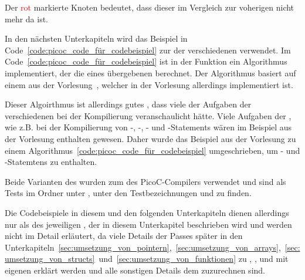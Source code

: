 \begin{Special_Paragraph}
  Der \textcolor{red}{rot} markierte Knoten bedeutet, dass dieser im Vergleich zur voherigen  nicht mehr da ist.
\end{Special_Paragraph}


In den nächsten Unterkapiteln wird das Beispiel in Code~\ref{code:picoc_code_für_codebeispiel} zur  der verschiedenen  verwendet. Im Code~\ref{code:picoc_code_für_codebeispiel} ist in der Funktion  ein  Algorithmus implementiert, der die  eines übergebenen  berechnet. Der Algorithmus basiert auf einem  aus der Vorlesung~\cite{scholl_betriebssysteme_2020}, welcher in der Vorlesung allerdings  implementiert ist.

Dieser  Algoirthmus ist allerdings  gutes , dass viele der Aufgaben der verschiedenen  bei der Kompilierung veranschaulicht hätte. Viele Aufgaben der , wie z.B. bei der Kompilierung von -, -, - und -Statements wären im Beispiel aus der Vorlesung  enthalten gewesen. Daher wurde das Beispiel aus der Vorlesung zu einem  Algorithmus~\ref{code:picoc_code_für_codebeispiel} umgeschrieben, um - und -Statemtens zu enthalten.

Beide Varianten des  wurden zum  des PicoC-Compilers verwendet und sind als Tests im Ordner  unter , unter den Testbezeichnungen  und  zu finden.

Die Codebeispiele in diesem und den folgenden Unterkapiteln dienen allerdings nur als  des jeweiligen , der in diesem Unterkapitel beschrieben wird und werden nicht im Detail erläutert, da viele Details der Passes später in den Unterkapiteln~\ref{sec:umsetzung_von_pointern},~\ref{sec:umsetzung_von_arrays},~\ref{sec:umsetzung_von_structs}~und~\ref{sec:umsetzung_von_funktionen} zu ,  ,  und  mit eigenen  erklärt werden und alle sonstigen Details dem  zuzurechnen sind.

